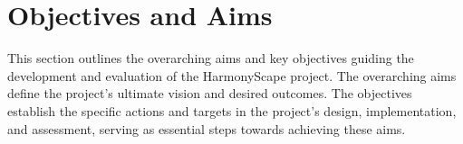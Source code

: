 \documentclass{l4proj}
\begin{document}






\section{Objectives and Aims}
This section outlines the overarching aims and key objectives guiding the development and evaluation of the HarmonyScape project. The overarching aims define the project's ultimate vision and desired outcomes. The objectives establish the specific actions and targets in the project's design, implementation, and assessment, serving as essential steps towards achieving these aims.
\end{document}
